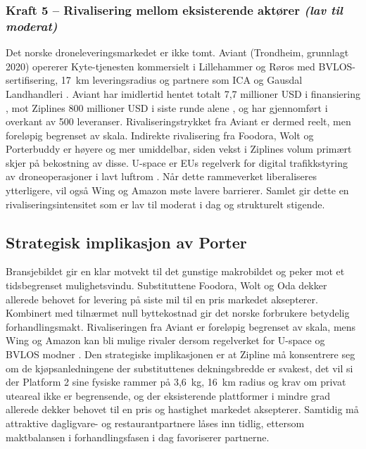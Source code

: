 \subsubsection{Kraft 5 -- Rivalisering mellom eksisterende aktører
\normalfont\textit{(lav til moderat)}}

Det norske droneleveringsmarkedet er ikke tomt. Aviant (Trondheim, grunnlagt
2020) opererer Kyte-tjenesten kommersielt i Lillehammer og Røros med
BVLOS-sertifisering, 17~km leveringsradius og partnere som ICA og Gausdal
Landhandleri \parencite{aviant2024}. Aviant har imidlertid hentet totalt
7,7 millioner USD i finansiering \parencite{cbinsights_aviant}, mot Ziplines
800 millioner USD i siste runde alene \parencite{korosec2026_zipline}, og har
gjennomført i overkant av 500 leveranser. Rivaliseringstrykket fra Aviant er
dermed reelt, men foreløpig begrenset av skala. Indirekte rivalisering fra
Foodora, Wolt og Porterbuddy er høyere og mer umiddelbar, siden vekst i
Ziplines volum primært skjer på bekostning av disse. U-space er EUs
regelverk for digital trafikkstyring av droneoperasjoner i lavt luftrom
\parencite{euuas2021}. Når dette rammeverket liberaliseres ytterligere,
vil også Wing og Amazon møte lavere barrierer. Samlet gir dette en rivaliseringsintensitet som
er lav til moderat i dag og strukturelt stigende.

\subsection{Strategisk implikasjon av Porter}
Bransjebildet gir en klar motvekt til det gunstige makrobildet og peker mot
et tidsbegrenset mulighetsvindu. Substituttene Foodora, Wolt og Oda dekker
allerede behovet for levering på siste mil til en pris markedet aksepterer.
Kombinert med tilnærmet null byttekostnad gir det norske forbrukere
betydelig forhandlingsmakt. Rivaliseringen fra Aviant er foreløpig begrenset
av skala, mens Wing og Amazon kan bli mulige rivaler dersom regelverket
for U-space og BVLOS modner \parencite{euuas2021, lovdata2024_uspace}.
Den strategiske implikasjonen er at Zipline må konsentrere seg om de
kjøpsanledningene der substituttenes dekningsbredde er svakest, det vil
si der Platform 2 sine fysiske rammer på 3,6~kg, 16~km radius og krav om
privat uteareal ikke er begrensende, og der eksisterende plattformer i
mindre grad allerede dekker behovet til en pris og hastighet markedet
aksepterer. Samtidig må attraktive dagligvare- og restaurantpartnere
låses inn tidlig, ettersom maktbalansen i forhandlingsfasen i dag
favoriserer partnerne.
